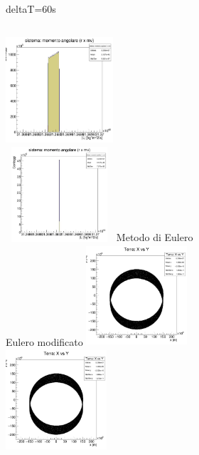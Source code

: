         \begin{frame}{deltaT=60s}
            \begin{columns}
                    \centering
                    \includegraphics[width=4cm,height=4cm]{2_approx/L0_100.jpg}\\
                    \includegraphics[width=4cm,height=3.5cm]{2_approx/L100_1.jpg}
                    \label{cfr::L2}
                    \centering
                    Metodo di Eulero\\
                    \vspace{2cm}
                    Eulero modificato
                    \centering
                    \includegraphics[width=3.75cm,height=3.75cm]{2_approx/terraxy_100_0.jpg}\\
                    \includegraphics[width=3.75cm,height=3.75cm]{2_approx/terraxy_100__60_1.jpg}
                    \label{cfr::xy2}
            \end{columns}
        \end{frame}

